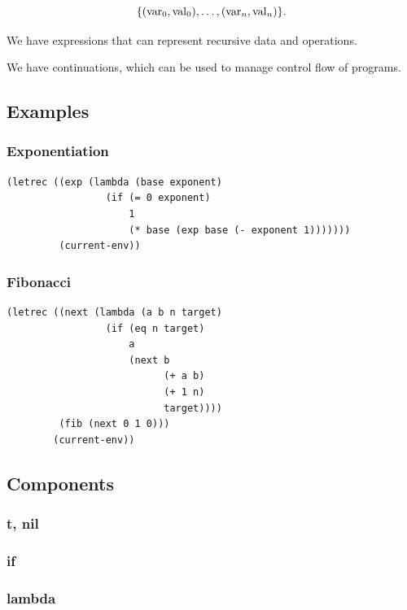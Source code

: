 \documentclass[10pt, english]{article}
\begin{document}
$$\{(\mathrm{var}_{0}, \mathrm{val}_{0}), \dots, (\mathrm{var}_{n}, \mathrm{val}_{n})\}.$$



We have expressions that can represent recursive data and operations.

We have continuations, which can be used to manage control flow of programs.






\subsection{Examples}


\subsubsection{Exponentiation}

\begin{verbatim}
(letrec ((exp (lambda (base exponent)
                 (if (= 0 exponent)
                     1
                     (* base (exp base (- exponent 1)))))))
         (current-env))
\end{verbatim}


\subsubsection{Fibonacci}

\begin{verbatim}
(letrec ((next (lambda (a b n target)
                 (if (eq n target)
                     a
                     (next b
                           (+ a b)
                           (+ 1 n)
                           target))))
         (fib (next 0 1 0)))
        (current-env))
\end{verbatim}

\subsection{Components}

\subsubsection{t, nil}

\subsubsection{if}

\subsubsection{lambda}
\end{document}
